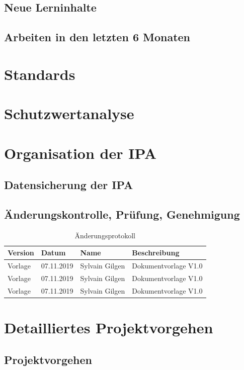 \documentclass{report}
\begin{document}
\section{Neue Lerninhalte}
\section{Arbeiten in den letzten 6 Monaten}


\chapter{Standards}

\chapter{Schutzwertanalyse}

\chapter{Organisation der IPA}
\section{Datensicherung der IPA}
\section{Änderungskontrolle, Prüfung, Genehmigung}
\begin{table}[h!]
    \begin{tabular}{|L{0.1\textwidth}|L{0.23\textwidth}|L{0.23\textwidth}|L{0.33\textwidth}|}
        \hline
        Version & Datum & Name & Beschreibung \\[11pt]
        \hline
        Vorlage & 07.11.2019 & Sylvain Gilgen & Dokumentvorlage V1.0\\
        \hline
        Vorlage & 07.11.2019 & Sylvain Gilgen & Dokumentvorlage V1.0\\
        \hline
        Vorlage & 07.11.2019 & Sylvain Gilgen & Dokumentvorlage V1.0\\
        \hline
    \end{tabular}
    \caption{Änderungsprotokoll}
\end{table}
\chapter{Detailliertes Projektvorgehen}
\section{Projektvorgehen}
\end{document}
